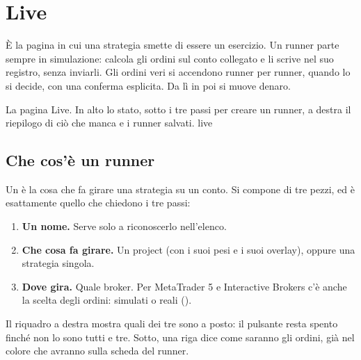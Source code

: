 \chapter{Live}\label{cap:live}
\raggedbottom

È la pagina in cui una strategia smette di essere un esercizio. Un runner
parte sempre in simulazione: calcola gli ordini sul conto collegato e li
scrive nel suo registro, senza inviarli. Gli ordini veri si accendono runner
per runner, quando lo si decide, con una conferma esplicita. Da lì in poi si
muove denaro.

  {La pagina Live. In alto lo stato, sotto i tre passi per creare un runner,
   a destra il riepilogo di ciò che manca e i runner salvati.}
  {live}

\section{Che cos'è un runner}\label{sez:runner}

Un  è la cosa che fa girare una strategia su un conto. Si
compone di tre pezzi, ed è esattamente quello che chiedono i tre passi:

\begin{enumerate}
  \item \textbf{Un nome.} Serve solo a riconoscerlo nell'elenco.
  \item \textbf{Che cosa fa girare.} Un project (con i suoi pesi e i suoi
        overlay), oppure una strategia singola.
  \item \textbf{Dove gira.} Quale broker. Per MetaTrader 5 e Interactive
        Brokers c'è anche la scelta degli ordini: simulati o reali
        ().
\end{enumerate}

\noindent
Il riquadro a destra mostra quali dei tre sono a posto: il pulsante
 resta spento finché non lo sono tutti e tre. Sotto,
una riga dice come saranno gli ordini, già nel colore che avranno sulla
scheda del runner.

